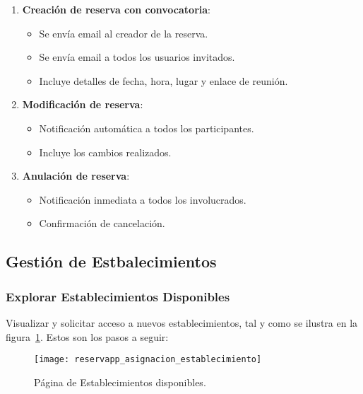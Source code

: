 \begin{enumerate}
   \item \textbf{Creación de reserva con convocatoria}:
   \begin{itemize}
      \item Se envía email al creador de la reserva.
      \item Se envía email a todos los usuarios invitados.
	  \item Incluye detalles de fecha, hora, lugar y enlace de reunión.
   \end{itemize}
   \item \textbf{Modificación de reserva}:
   \begin{itemize}
      \item Notificación automática a todos los participantes.
      \item Incluye los cambios realizados.
   \end{itemize}
   \item \textbf{Anulación de reserva}:
   \begin{itemize}
      \item Notificación inmediata a todos los involucrados.
      \item Confirmación de cancelación.
   \end{itemize}
\end{enumerate}

\subsection{Gestión de Estbalecimientos}

\subsubsection{Explorar Establecimientos Disponibles}
Visualizar y solicitar acceso a nuevos establecimientos, tal y como se ilustra en la figura~\ref{fig:reservapp_asignacion_establecimiento}. Estos son los pasos a seguir:

\begin{figure}[H]
	\centering
		\texttt{[image: reservapp\_asignacion\_establecimiento]}
	\caption{Página de Establecimientos disponibles.}
	\label{fig:reservapp_asignacion_establecimiento}
\end{figure}

